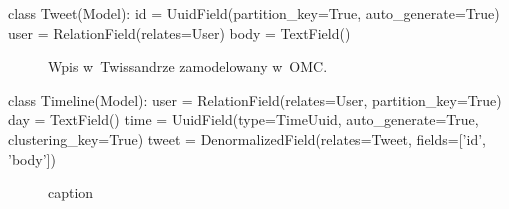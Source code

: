 \begin{verbbox}
	class Tweet(Model):
	    id = UuidField(partition_key=True, 
	                   auto_generate=True)
	    user = RelationField(relates=User)
	    body = TextField()
\end{verbbox}

\begin{figure}[ht!]
	\centering
	\theverbbox
	\caption{Wpis w~Twissandrze zamodelowany w~OMC.}
	\label{vrb:omc_twissandra_tweet}
\end{figure}

\begin{verbbox}
	class Timeline(Model):
	    user = RelationField(relates=User,
	                         partition_key=True)
	    day = TextField()
	    time = UuidField(type=TimeUuid, 
	                     auto_generate=True,
	                     clustering_key=True)
	    tweet = DenormalizedField(relates=Tweet,
	                              fields=['id', 'body'])
\end{verbbox}

\begin{figure}[ht!]
	\centering
	\theverbbox
	\caption{caption}
	\label{vrb:label}
\end{figure}